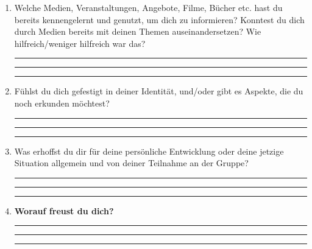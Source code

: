 \documentclass[a4paper,12pt]{article}
\begin{document}
\begin{enumerate}[label=--]
    \item Welche Medien, Veranstaltungen, Angebote, Filme, Bücher etc. hast du bereits kennengelernt und genutzt, um dich zu informieren? Konntest du dich durch Medien bereits mit deinen Themen auseinandersetzen? Wie hilfreich/weniger hilfreich war das?  
    
    \rule{12cm}{0.2pt}

    \rule{12cm}{0.2pt}
    
    \rule{12cm}{0.2pt}
    
    \item Fühlst du dich gefestigt in deiner Identität, und/oder gibt es Aspekte, die du noch erkunden möchtest?  
    
    \rule{12cm}{0.2pt}
    
    \rule{12cm}{0.2pt}
    
    \rule{12cm}{0.2pt}
    
    \item Was erhoffst du dir für deine persönliche Entwicklung oder deine jetzige Situation allgemein und von deiner Teilnahme an der Gruppe?  
   
    \rule{12cm}{0.2pt}
    
    \rule{12cm}{0.2pt}
    
    \rule{12cm}{0.2pt}
    
    \item \textbf{Worauf freust du dich?}  
   
    \rule{12cm}{0.2pt}

    \rule{12cm}{0.2pt}
    
    \rule{12cm}{0.2pt}
\end{enumerate}
\end{document}
